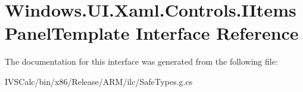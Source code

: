 \hypertarget{interface_windows_1_1_u_i_1_1_xaml_1_1_controls_1_1_i_items_panel_template}{}\section{Windows.\+U\+I.\+Xaml.\+Controls.\+I\+Items\+Panel\+Template Interface Reference}
\label{interface_windows_1_1_u_i_1_1_xaml_1_1_controls_1_1_i_items_panel_template}


The documentation for this interface was generated from the following file\+:\begin{DoxyCompactItemize}
\item 
I\+V\+S\+Calc/bin/x86/\+Release/\+A\+R\+M/ilc/Safe\+Types.\+g.\+cs\end{DoxyCompactItemize}
